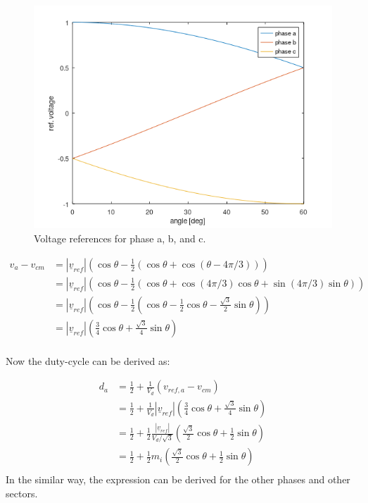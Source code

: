 \documentclass[]{book}
\begin{document}
\begin{figure}
\includegraphics[width=0.75\linewidth]{images/modulation/phase-ref-voltages-abc} \caption{Voltage references for phase a, b, and c.}\label{fig:unnamed-chunk-6}
\end{figure}

\[
\begin{aligned}
v_a-v_{cm}  & = |\underline{v}_{ref}| \left( \cos{\theta} - \frac{1}{2}(\cos{\theta}  + \cos{(\theta - 4\pi/3)})  \right)\\
& = |\underline{v}_{ref}| \left( \cos{\theta} - \frac{1}{2}(\cos{\theta}  + \cos{(4\pi/3)}\cos{\theta}+\sin{( 4\pi/3)}\sin{\theta})  \right)\\
& = |\underline{v}_{ref}| \left( \cos{\theta} - \frac{1}{2}(\cos{\theta}  - \frac{1}{2}\cos{\theta} - \frac{\sqrt{3}}{2}\sin{\theta})  \right)\\
& = |\underline{v}_{ref}| ( \frac{3}{4} \cos{\theta}  + \frac{\sqrt{3}}{4}\sin{\theta}  )\\
\end{aligned}
\]

Now the duty-cycle can be derived as:

\[
\begin{aligned}
d_a  & = \frac{1}{2} +\frac{1}{V_d}  (v_{ref,a} - v_{cm}) \\
  & = \frac{1}{2} +\frac{1}{V_d}  |\underline{v}_{ref}| ( \frac{3}{4} \cos{\theta}  + \frac{\sqrt{3}}{4}\sin{\theta}  ) \\
  & = \frac{1}{2} + \frac{1}{2} \frac{|\underline{v}_{ref}|}{V_d/\sqrt{3}} ( \frac{\sqrt{3}}{2} \cos{\theta}  + \frac{1}{2}\sin{\theta}  ) \\
& = \frac{1}{2} +  \frac{1}{2} m_i  ( \frac{\sqrt{3}}{2} \cos{\theta}  + \frac{1}{2}\sin{\theta}  ) \\
\end{aligned}
\]
In the similar way, the expression can be derived for the other phases and other sectors.
\end{document}

